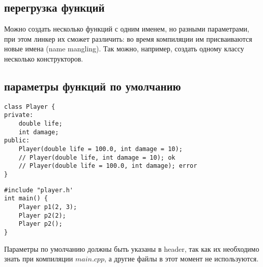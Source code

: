 \subsection{перегрузка функций}
Можно создать несколько функций с одним именем, но разными параметрами, при этом линкер их сможет различить: во время компиляции  им присваиваются новые имена (name mangling). Так можно, например, создать одному классу несколько конструкторов.
\subsection{параметры функций по умолчанию}
\begin{verbatim}
class Player {
private:
    double life;
    int damage;
public:
    Player(double life = 100.0, int damage = 10);
    // Player(double life, int damage = 10); ok
    // Player(double life = 100.0, int damage); error
}
\end{verbatim}
\begin{verbatim}
#include "player.h'
int main() {
    Player p1(2, 3);
    Player p2(2);
    Player p2();
}
\end{verbatim}
Параметры по умолчанию должны быть указаны в  header, так как их необходимо знать при компиляции $main.cpp$, а другие файлы в этот момент не используются.
